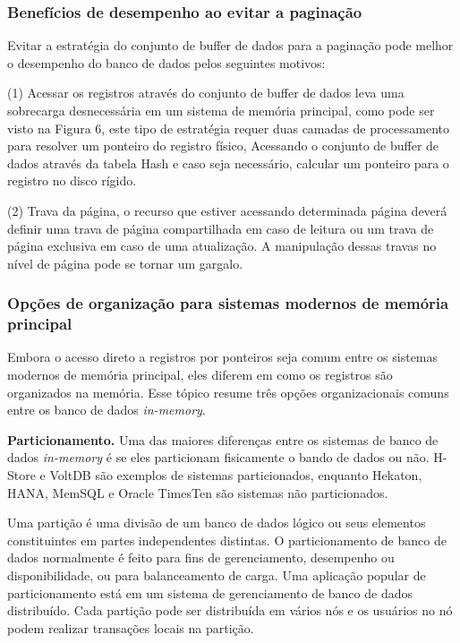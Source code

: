 \subsubsection{Benefícios de desempenho ao evitar a paginação}

Evitar a estratégia do conjunto de buffer de dados para a paginação pode melhor o desempenho do banco de dados pelos seguintes motivos: 

\begin{compactitem}
    \item[(1)] Acessar os registros através do conjunto de buffer de dados leva uma sobrecarga desnecessária em um sistema  de memória principal, como pode ser visto na Figura 6, este tipo de estratégia requer duas camadas de processamento para resolver um ponteiro do registro físico, Acessando o conjunto de buffer de dados através da tabela Hash e caso seja necessário, calcular um ponteiro para o registro no disco rígido. 
    
    \item[(2)] Trava da página, o recurso que estiver acessando determinada página deverá definir uma trava de página compartilhada em caso de leitura ou um trava de página exclusiva em caso de uma atualização. A manipulação dessas travas no nível de página pode se tornar um gargalo.  

\end{compactitem}

\subsubsection{Opções de organização para sistemas modernos de memória principal}
Embora o acesso direto a registros por ponteiros seja comum entre os sistemas modernos de memória principal, eles diferem em como os registros são organizados na memória. Esse tópico resume três opções organizacionais comuns entre os banco de dados \textit{in-memory}. 

\textbf{Particionamento.} Uma das maiores diferenças entre os sistemas de banco de dados \textit{in-memory} é se eles particionam fisicamente o bando de dados ou não. H-Store e VoltDB são exemplos de sistemas particionados, enquanto Hekaton, HANA, MemSQL e Oracle TimesTen são sistemas não particionados. 
 
 
Uma partição é uma divisão de um banco de dados lógico ou seus elementos constituintes em partes independentes distintas. O particionamento de banco de dados normalmente é feito para fins de gerenciamento, desempenho ou disponibilidade, ou para balanceamento de carga. Uma aplicação popular de particionamento está em um sistema de gerenciamento de banco de dados distribuído. Cada partição pode ser distribuída em vários nós e os usuários no nó podem realizar transações locais na partição. \cite{Navathe} 
    
